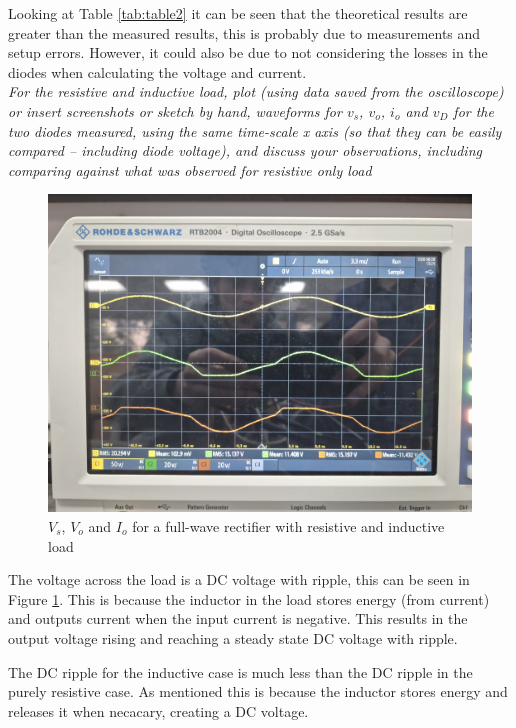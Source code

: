 \documentclass[12pt,a4paper]{article}
\begin{document}
Looking at Table \ref{tab:table2} it can be seen that the theoretical results are greater than the measured results, this is probably due to measurements and setup errors. However, it could also be due to not considering the losses in the diodes when calculating the voltage and current.\\

\textit{For the resistive and inductive load, plot (using data saved from the oscilloscope) or insert
screenshots or sketch by hand, waveforms for $v_s$, $v_o$, $i_o$ and $v_D$ for the two diodes measured, using
the same time-scale x axis (so that they can be easily compared – including diode voltage), and
discuss your observations, including comparing against what was observed for resistive only load}\\

\begin{figure}[H]
	\centering
\includegraphics[width=.7\columnwidth]{Images/20250828_133520.jpg}
\caption{$V_s$, $V_o$ and $I_o$ for a full-wave rectifier with resistive and inductive load 
\label{fig:figure3}}
\end{figure}

The voltage across the load is a DC voltage with ripple, this can be seen in Figure \ref{fig:figure3}. This is because the inductor in the load stores energy (from current) and outputs current when the input current is negative. This results in the output voltage rising and reaching a steady state DC voltage with ripple.

The DC ripple for the inductive case is much less than the DC ripple in the purely resistive case. As mentioned this is because the inductor stores energy and releases it when necacary, creating a DC voltage.
\end{document}
